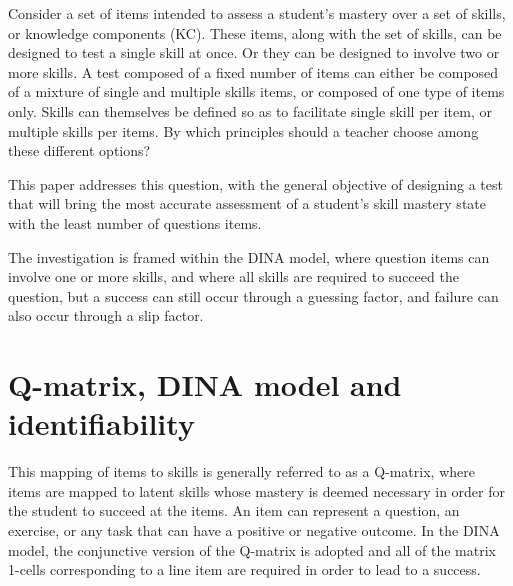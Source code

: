 \documentclass{edm_template}
\begin{document}
Consider a set of items intended to assess a student's mastery over a set of skills, or knowledge components (KC).  These items, along with the set of skills, can be designed to test a single skill at once.  Or they can be designed to involve two or more skills.  A test composed of a fixed number of items can either be composed of a mixture of single and multiple skills items, or composed of one type of items only.  Skills can themselves be defined so as to facilitate single skill per item, or multiple skills per items.  By which principles should a teacher choose among these different options?

This paper addresses this question, with the general objective of designing a test that will bring the most accurate assessment of a student's skill mastery state with the least number of questions items.  

The investigation is framed within the DINA model, where question items can involve one or more skills, and where all skills are required to succeed the question, but a success can still occur through a guessing factor, and failure can also occur through a slip factor.  


\section{Q-matrix, DINA model and identifiability}

This mapping of items to skills is generally referred to as a Q-matrix, where items are mapped to latent skills whose mastery is deemed necessary in order for the student to succeed at the items.  An item can represent a question, an exercise, or any task that can have a positive or negative outcome.  In the DINA model, the conjunctive version of the Q-matrix is adopted and all of the matrix 1-cells corresponding to a line item are required in order to lead to a success.  
\end{document}
